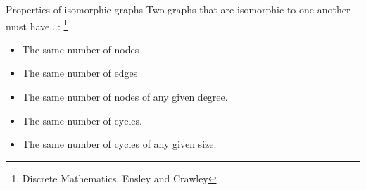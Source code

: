     \newpage

    \begin{intro}{Properties of isomorphic graphs}
        Two graphs that are isomorphic to one another must have...:
        \footnote{Discrete Mathematics, Ensley and Crawley} 
        \begin{itemize}
            \item   The same number of nodes
            \item   The same number of edges
            \item   The same number of nodes of any given degree.
            \item   The same number of cycles.
            \item   The same number of cycles of any given size.
        \end{itemize}
    \end{intro}

